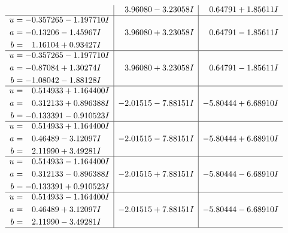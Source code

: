 \documentclass[1p]{elsarticle_modified}
\theoremstyle{definition}
\begin{document}
$$\begin{array}{c|c|c}
 & \phantom{-}3.96080 - 3.23058 I & \phantom{-}0.64791 + 1.85611 I \\ \hline\begin{aligned}
u &= -0.357265 - 1.197710 I \\
a &= -0.13206 - 1.45967 I \\
b &= \phantom{-}1.16104 + 0.93427 I\end{aligned}
 & \phantom{-}3.96080 + 3.23058 I & \phantom{-}0.64791 - 1.85611 I \\ \hline\begin{aligned}
u &= -0.357265 - 1.197710 I \\
a &= -0.87084 + 1.30274 I \\
b &= -1.08042 - 1.88128 I\end{aligned}
 & \phantom{-}3.96080 + 3.23058 I & \phantom{-}0.64791 - 1.85611 I \\ \hline\begin{aligned}
u &= \phantom{-}0.514933 + 1.164400 I \\
a &= \phantom{-}0.312133 + 0.896388 I \\
b &= -0.133391 - 0.910523 I\end{aligned}
 & -2.01515 - 7.88151 I & -5.80444 + 6.68910 I \\ \hline\begin{aligned}
u &= \phantom{-}0.514933 + 1.164400 I \\
a &= \phantom{-}0.46489 - 3.12097 I \\
b &= \phantom{-}2.11990 + 3.49281 I\end{aligned}
 & -2.01515 - 7.88151 I & -5.80444 + 6.68910 I \\ \hline\begin{aligned}
u &= \phantom{-}0.514933 - 1.164400 I \\
a &= \phantom{-}0.312133 - 0.896388 I \\
b &= -0.133391 + 0.910523 I\end{aligned}
 & -2.01515 + 7.88151 I & -5.80444 - 6.68910 I \\ \hline\begin{aligned}
u &= \phantom{-}0.514933 - 1.164400 I \\
a &= \phantom{-}0.46489 + 3.12097 I \\
b &= \phantom{-}2.11990 - 3.49281 I\end{aligned}
 & -2.01515 + 7.88151 I & -5.80444 - 6.68910 I\\
 \hline 
 \end{array}$$\newpage$$\begin{array}{c|c|c}  

\end{array}$$
\end{document}
